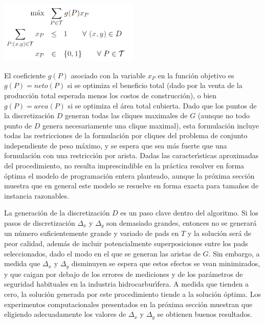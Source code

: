 \begin{center}
\includegraphics[width=0.5\textwidth]{imagenes/formula}
\end{center}




El coeficiente $g(P)$ asociado con la variable $x_P$ en la funci\'on objetivo es $g(P) = neto(P)$ si se optimiza el beneficio total (dado por la venta de la producci\'on total esperada menos los costos de construcci\'on), o bien $g(P) = area(P)$ si se optimiza el \'area total cubierta. 
Dado que los puntos de la discretizaci\'on $D$ generan todas las cliques maximales de $G$ (aunque no todo punto de $D$ genera necesariamente una clique maximal), esta formulaci\'on incluye todas las restricciones de la formulaci\'on por cliques del problema de conjunto independiente de peso m\'aximo, y se espera que sea m\'as fuerte que una formulaci\'on con una restricci\'on por arista. Dadas las caracter\'\i sticas aproximadas del procedimiento, no resulta imprescindible en la pr\'actica resolver en forma \'optima el modelo de programaci\'on entera planteado, aunque la pr\'oxima secci\'on muestra que en general este modelo se resuelve en forma exacta para tama\~nos de instancia razonables.

La generaci\'on de la discretizaci\'on $D$ es un paso clave dentro del algoritmo. Si los pasos de discretizaci\'on $\Delta_x$ y $\Delta_y$ son demasiado grandes, entonces no se generar\'a un n\'umero suficientemente grande y variado de pads en $T$ y la soluci\'on ser\'a de peor calidad, adem\'as de incluir potencialmente superposiciones entre los pads seleccionados, dado el modo en el que se generan las aristas de $G$. Sin embargo, a medida que $\Delta_x$ y $\Delta_y$ disminuyen se espera que estos efectos se vean minimizados, y que caigan por debajo de los errores de mediciones y de los par\'ametros de seguridad habituales en la industria hidrocarbur\'\i fera. A medida que  tienden a cero, la soluci\'on generada por este procedimiento tiende a la soluci\'on \'optima. Los experimentos computacionales presentados en la pr\'oxima secci\'on muestran que eligiendo adecuadamente los valores de $\Delta_x$ y $\Delta_y$ se obtienen buenos resultados.

